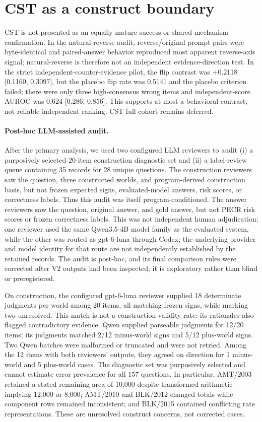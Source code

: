 \documentclass[11pt]{article}
\begin{document}
\section{CST as a construct boundary}
CST is not presented as an equally mature success or shared-mechanism confirmation. In the natural-reverse audit, reverse/original prompt pairs were byte-identical and paired-answer behavior reproduced most apparent reverse-axis signal; natural-reverse is therefore not an independent evidence-direction test. In the strict independent-counter-evidence pilot, the flip contrast was +0.2118 [0.1160, 0.3097], but the placebo flip rate was 0.5141 and the placebo criterion failed; there were only three high-consensus wrong items and independent-score AUROC was 0.624 [0.286, 0.856]. This supports at most a behavioral contrast, not reliable independent ranking. CST full cohort remains deferred.

\paragraph{Post-hoc LLM-assisted audit.} After the primary analysis, we used two configured LLM reviewers to audit (i) a purposively selected 20-item construction diagnostic set and (ii) a label-review queue containing 35 records for 28 unique questions. The construction reviewers saw the question, three constructed worlds, and program-derived construction basis, but not frozen expected signs, evaluated-model answers, risk scores, or correctness labels. Thus this audit was itself program-conditioned. The answer reviewers saw the question, original answer, and gold answer, but not PECR risk scores or frozen correctness labels. This was not independent human adjudication: one reviewer used the same Qwen3.5-4B model family as the evaluated system, while the other was routed as gpt-6-luna through Codex; the underlying provider and model identity for that route are not independently established by the retained records. The audit is post-hoc, and its final comparison rules were corrected after V2 outputs had been inspected; it is exploratory rather than blind or preregistered.

On construction, the configured gpt-6-luna reviewer supplied 18 determinate judgments per world among 20 items, all matching frozen signs, while marking two unresolved. This match is not a construction-validity rate: its rationales also flagged contradictory evidence. Qwen supplied parseable judgments for 12/20 items; its judgments matched 2/12 minus-world signs and 5/12 plus-world signs. Two Qwen batches were malformed or truncated and were not retried. Among the 12 items with both reviewers' outputs, they agreed on direction for 1 minus-world and 5 plus-world cases. The diagnostic set was purposively selected and cannot estimate error prevalence for all 157 questions. In particular, AMT/2003 retained a stated remaining area of 10,000 despite transformed arithmetic implying 12,000 or 8,000; AMT/2010 and BLK/2012 changed totals while component rows remained inconsistent; and BLK/2015 contained conflicting rate representations. These are unresolved construct concerns, not corrected cases.
\end{document}
